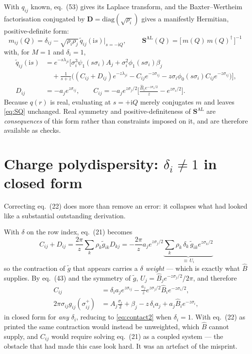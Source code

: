 \documentclass[11pt,a4paper]{article}
\newcommand{\Shat}{\bm{S}}
\newcommand{\eqBH}[1]{eq.~(#1)}
\begin{document}
With $q_{ij}$ known, \eqBH{53} gives its Laplace transform, and the
Baxter--Wertheim factorisation conjugated by $\bm D=\mathrm{diag}(\sqrt{\rho_i})$
gives a manifestly Hermitian, positive-definite form:
\begin{equation}
  m_{ij}(Q)=\delta_{ij}-\sqrt{\rho_i\rho_j}\,\tilde q_{ij}(\mathrm{i}s)
   \big|_{s=-\mathrm{i}Q},\qquad
  \boxed{\;\Shat^{\mathrm{AL}}(Q)=\big[\,m(Q)\,m(Q)^\dagger\,\big]^{-1}\;}
  \label{eq:SQ}
\end{equation}
with, for $M=1$ and $\delta_i=1$,
\begin{align}
  \tilde q_{ij}(\mathrm{i}s)&=e^{-s\lambda_{ji}}\Big[
    \sigma_i^3\psi_1(s\sigma_i)A_j+\sigma_i^2\phi_1(s\sigma_i)\beta_j
    \nonumber\\
   &\quad+\tfrac{1}{s+z}\big((C_{ij}{+}D_{ij})e^{-z\lambda_{ji}}
     -C_{ij}e^{-z\sigma_{ij}}
     -z\sigma_i\phi_0(s\sigma_i)C_{ij}e^{-z\sigma_{ij}}\big)\Big],\\
  D_{ij}&=-a_je^{z\sigma_{ij}},\qquad
  C_{ij}=-a_je^{z\sigma_j/2}\Big[\tfrac{\hat B_ie^{-z\sigma_i/2}}{z}
   -e^{z\sigma_i/2}\Big].
\end{align}
Because $q(r)$ is real, evaluating at $s=+\mathrm{i}Q$ merely conjugates $m$
and leaves \eqref{eq:SQ} unchanged. Real symmetry and positive-definiteness of
$\Shat^{\mathrm{AL}}$ are \emph{consequences} of this form rather than
constraints imposed on it, and are therefore available as checks.

\section{Charge polydispersity: $\delta_i\neq1$ in closed form}
\label{sec:delta}

Correcting \eqBH{22} does more than remove an error: it collapses what had
looked like a substantial outstanding derivation.

With $\delta$ on the row index, \eqBH{21} becomes
\begin{equation}
  C_{ij}+D_{ij}=\frac{2\pi}{z}\sum_k\rho_k\tilde g_{ik}D_{kj}
  =-\frac{2\pi}{z}a_j e^{z\sigma_j/2}\underbrace{\sum_k\rho_k\,\delta_k\,
    \tilde g_{ik}e^{z\sigma_k/2}}_{\textstyle \equiv\,U_i}
\end{equation}
so the contraction of $\tilde g$ that appears carries a \emph{$\delta$ weight}
--- which is exactly what $\hat B$ supplies. By \eqBH{43} and the symmetry of
$\tilde g$, $U_j=\hat B_je^{-z\sigma_j/2}/2\pi$, and therefore
\begin{align}
  C_{ij}&=\delta_i a_j e^{z\sigma_{ij}}
    -\frac{a_j}{z}e^{z\sigma_j/2}\hat B_ie^{-z\sigma_i/2},\\
  2\pi\sigma_{ij}g_{ij}(\sigma^+_{ij})
    &=A_j\frac{\sigma_i}{2}+\beta_j-z\,\delta_i a_j+a_j\hat B_ie^{-z\sigma_i},
  \label{eq:contactdelta}
\end{align}
in closed form for \emph{any} $\delta_i$, reducing to \eqref{eq:contact2} when
$\delta_i=1$. With \eqBH{22} as printed the same contraction would instead be
unweighted, which $\hat B$ cannot supply, and $C_{ij}$ would require solving
\eqBH{21} as a coupled system --- the obstacle that had made this case look
hard. It was an artefact of the misprint.
\end{document}
